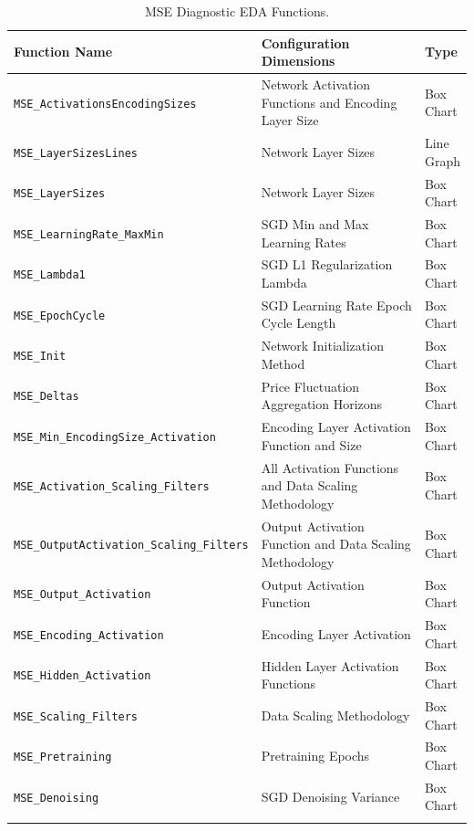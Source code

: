 \documentclass[a4paper,11pt,oneside]{article}
\theoremstyle{plain}
\theoremstyle{definition}
\begin{document}
	\begin{longtable}{|p{0.5\linewidth}|p{0.4\linewidth}|p{0.1\linewidth}|}
		\hline
		\textbf{Function Name} &\textbf{Configuration Dimensions}&\textbf{Type}  \\\hline	
		\texttt{MSE\_ActivationsEncodingSizes} & {Network Activation Functions and Encoding Layer Size}& {Box Chart} \\\hline
		\texttt{MSE\_LayerSizesLines} & {Network Layer Sizes}& {Line Graph} \\\hline
		\texttt{MSE\_LayerSizes} & {Network Layer Sizes}& {Box Chart} \\\hline
		\texttt{MSE\_LearningRate\_MaxMin} & {SGD Min and Max Learning Rates}& {Box Chart} \\\hline
		\texttt{MSE\_Lambda1} & {SGD L1 Regularization Lambda}& {Box Chart} \\\hline
		\texttt{MSE\_EpochCycle} & {SGD Learning Rate Epoch Cycle Length}& {Box Chart} \\\hline
		\texttt{MSE\_Init} & {Network Initialization Method}& {Box Chart} \\\hline
		\texttt{MSE\_Deltas} & {Price Fluctuation Aggregation Horizons}& {Box Chart} \\\hline
		\texttt{MSE\_Min\_EncodingSize\_Activation} & {Encoding Layer Activation Function and Size}& {Box Chart} \\\hline
		\texttt{MSE\_Activation\_Scaling\_Filters} & {All Activation Functions and Data Scaling Methodology}& {Box Chart} \\\hline
		\texttt{MSE\_OutputActivation\_Scaling\_Filters} & {Output Activation Function and Data Scaling Methodology}& {Box Chart} \\\hline
		\texttt{MSE\_Output\_Activation} & {Output Activation Function}& {Box Chart} \\\hline
		\texttt{MSE\_Encoding\_Activation} & {Encoding Layer Activation}& {Box Chart} \\\hline
		\texttt{MSE\_Hidden\_Activation} & {Hidden Layer Activation Functions}& {Box Chart} \\\hline
		\texttt{MSE\_Scaling\_Filters} & {Data Scaling Methodology}& {Box Chart} \\\hline
		\texttt{MSE\_Pretraining} & {Pretraining Epochs}& {Box Chart} \\\hline
		\texttt{MSE\_Denoising} & {SGD Denoising Variance}& {Box Chart} \\\hline
		
		\caption{MSE Diagnostic EDA Functions.}
		\label{tab_diagnostics_mse}
	\end{longtable}
	
	
	
	\newpage
	
	
	
	
	
	
	
	
\end{document}
